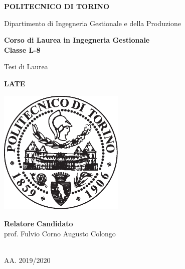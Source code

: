 \begin{titlepage}
   \begin{center}
       \begin{huge}
       \textbf{POLITECNICO DI TORINO}

       \end{huge}
	\vspace{0.5cm}
	\begin{large}
	Dipartimento di Ingegneria Gestionale e della Produzione
	\end{large}

       \vspace{1.1cm}
       \textbf{Corso di Laurea in Ingegneria Gestionale\\Classe L-8}
 
       \vspace{1.4cm}
 
       \begin{Large}
       Tesi di Laurea\\
       \end{Large}
 	
       \vspace{0.5cm}

       \begin{LARGE}
       \textbf{LATE}\\
       \vspace{0.2cm}
       \end{LARGE}

       \vspace{1.3cm}
    \includegraphics[width=0.45\textwidth]{resources/images/LogoPoliTO.eps}
      \vspace{2cm}
   \end{center}
   \textbf{Relatore} \hfill \textbf{Candidato}\\
   prof. Fulvio Corno \hfill Augusto Colongo\\ \\
  \vfill
  \begin{center}
	AA. 2019/2020
  \end{center}

\end{titlepage}
